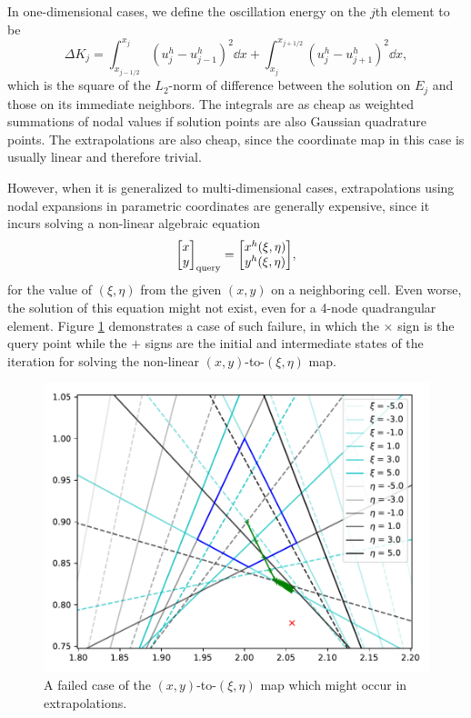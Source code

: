 \documentclass[10pt,draft]{article}
\begin{document}
%
In one-dimensional cases, we define the oscillation energy on the $j$th element to be
$$
\Delta K_j = \int_{x_{j-1/2}}^{x_{j}}\left(u_{j}^{h}-u_{j-1}^{h}\right)^{2}\dd{x}+\int_{x_{j}}^{x_{j+1/2}}\left(u_{j}^{h}-u_{j+1}^{h}\right)^{2}\dd{x},
$$
which is the square of the $L_2$-norm of difference between the solution on $E_j$ and those on its immediate neighbors.
%
The integrals are as cheap as weighted summations of nodal values if solution points are also Gaussian quadrature points.
%
The extrapolations are also cheap, since the coordinate map in this case is usually linear and therefore trivial.

%
However, when it is generalized to multi-dimensional cases, extrapolations using nodal expansions in parametric coordinates are generally expensive, since it incurs solving a non-linear algebraic equation
$$
\mqty[x \\ y]_\text{query} = \mqty[x^h(\xi, \eta) \\ y^h(\xi, \eta)],
$$
for the value of $(\xi,\eta)$ from the given $(x,y)$ on a neighboring cell.
%
Even worse, the solution of this equation might not exist, even for a 4-node quadrangular element.
%
Figure \ref{coordmap} demonstrates a case of such failure, in which the $\times$ sign is the query point while the $+$ signs are the initial and intermediate states of the iteration for solving the non-linear $(x,y)$-to-$(\xi,\eta)$ map.
%
\begin{figure}[H]
  \centering
  \includegraphics[width=.9\textwidth]{./coordmap.pdf}
  \caption{A failed case of the $(x,y)$-to-$(\xi,\eta)$ map which might occur in extrapolations.}
  \label{coordmap}
\end{figure}
%
\end{document}
